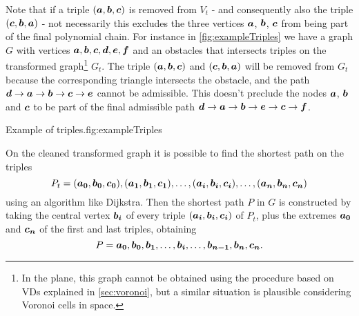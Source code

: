 \documentclass[dissertation.tex]{subfiles}
\begin{document}
Note that if a triple $(\boldsymbol{a},\boldsymbol{b},\boldsymbol{c})$ is removed from $V_t$ - and
consequently also the triple $(\boldsymbol{c},\boldsymbol{b},\boldsymbol{a})$ - not
necessarily this excludes
the three vertices $\boldsymbol{a}$, $\boldsymbol{b}$, $\boldsymbol{c}$ from being part of the final
polynomial chain. For instance in
\cref{fig:exampleTriples} we have a graph $G$ with vertices
$\boldsymbol{a},\boldsymbol{b},\boldsymbol{c},\boldsymbol{d},\boldsymbol{e},\boldsymbol{f}$ and an obstacles that
intersects triples on the transformed graph\footnote{In the plane, this graph cannot be
  obtained using the procedure based on \acp{VD} explained in
  \cref{sec:voronoi}, but a similar situation is plausible
  considering Voronoi cells in space.} $G_t$. The triple
$(\boldsymbol{a},\boldsymbol{b},\boldsymbol{c})$ and $(\boldsymbol{c},\boldsymbol{b},\boldsymbol{a})$ will be removed from $G_t$ because
the corresponding triangle intersects the obstacle, and the path
$\boldsymbol{d}\rightarrow \boldsymbol{a}\rightarrow \boldsymbol{b}\rightarrow \boldsymbol{c}\rightarrow \boldsymbol{e}$ cannot be
admissible. This doesn't preclude the nodes $\boldsymbol{a}$, $\boldsymbol{b}$ and $\boldsymbol{c}$ to be part
of the final admissible path $\boldsymbol{d}\rightarrow \boldsymbol{a}\rightarrow \boldsymbol{b}\rightarrow \boldsymbol{e}\rightarrow \boldsymbol{c}\rightarrow \boldsymbol{f}$.
\begin{myfig}{Example of triples.}{fig:exampleTriples}
\end{myfig}

On the cleaned transformed graph it is possible to find the shortest
path on the triples
$$
P_t=(\boldsymbol{a_0},\boldsymbol{b_0},\boldsymbol{c_0}), (\boldsymbol{a_1},\boldsymbol{b_1},\boldsymbol{c_1}),\dots,(\boldsymbol{a_i},\boldsymbol{b_i},\boldsymbol{c_i}),\dots,(\boldsymbol{a_n},\boldsymbol{b_n},\boldsymbol{c_n})
$$
 using
an algorithm like Dijkstra. Then the shortest
path $P$ in $G$ is constructed by taking the central vertex $\boldsymbol{b_i}$
of every 
triple $(\boldsymbol{a_i},\boldsymbol{b_i},\boldsymbol{c_i})$ of $P_t$, plus the extremes $\boldsymbol{a_0}$ and $\boldsymbol{c_n}$
of the first and last triples, obtaining
$$
P=\boldsymbol{a_0},\boldsymbol{b_0},\boldsymbol{b_1},\dots,\boldsymbol{b_i},\dots,\boldsymbol{b_{n-1}},\boldsymbol{b_n},\boldsymbol{c_n}.
$$
\end{document}
